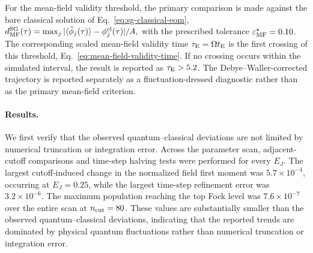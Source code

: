 \documentclass[pra,twocolumn,superscriptaddress,nofootinbib,floatfix]{revtex4-2}
\theoremstyle{remark}
\newcommand{\revcolor}{\color{blue}}
\DeclareRobustCommand{\rev}[1]{{\revcolor #1}}
\begin{document}
\rev{For the mean-field validity threshold, the primary comparison is made against the bare classical solution of Eq.~\eqref{eq:sg-classical-eom}, \(d_{\rm MF}^{\rm SG}(\tau)=\max_j|\langle\hat\phi_j(\tau)\rangle-\phi_j^{\rm cl}(\tau)|/A,\) with the prescribed tolerance \(\varepsilon_{\rm MF}^{\star}=0.10\).} \rev{The corresponding scaled mean-field validity time \(\tau_{\rm E}=\Omega t_{\rm E}\) is the first crossing of this threshold, Eq.~\eqref{eq:mean-field-validity-time}.} \rev{If no crossing occurs within the simulated interval, the result is reported as \(\tau_{\rm E}>5.2\).} The Debye--Waller-corrected trajectory is reported separately as a fluctuation-dressed diagnostic rather than as the primary mean-field criterion.

\paragraph{Results.}
We first verify that the observed quantum--classical deviations are not limited by numerical truncation or integration error. Across the parameter scan, adjacent-cutoff comparisons and time-step halving tests were performed for every \(E_J\). \rev{The largest cutoff-induced change in the normalized field first moment was \(5.7\times10^{-4}\), occurring at \(E_J=0.25\), while the largest time-step refinement error was \(3.2\times10^{-6}\).} \rev{The maximum population reaching the top Fock level was \(7.6\times10^{-7}\) over the entire scan at \(n_{\rm cut}=80\).} These values are substantially smaller than the observed quantum--classical deviations, indicating that the reported trends are dominated by physical quantum fluctuations rather than numerical truncation or integration error.
\end{document}
